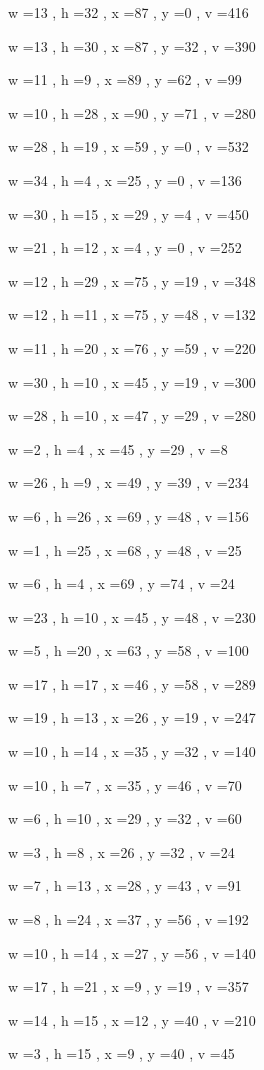 \documentclass[11pt]{article}
\begin{document}
w =13 , h =32 , x =87 , y =0 , v =416
\par
w =13 , h =30 , x =87 , y =32 , v =390
\par
w =11 , h =9 , x =89 , y =62 , v =99
\par
w =10 , h =28 , x =90 , y =71 , v =280
\par
w =28 , h =19 , x =59 , y =0 , v =532
\par
w =34 , h =4 , x =25 , y =0 , v =136
\par
w =30 , h =15 , x =29 , y =4 , v =450
\par
w =21 , h =12 , x =4 , y =0 , v =252
\par
w =12 , h =29 , x =75 , y =19 , v =348
\par
w =12 , h =11 , x =75 , y =48 , v =132
\par
w =11 , h =20 , x =76 , y =59 , v =220
\par
w =30 , h =10 , x =45 , y =19 , v =300
\par
w =28 , h =10 , x =47 , y =29 , v =280
\par
w =2 , h =4 , x =45 , y =29 , v =8
\par
w =26 , h =9 , x =49 , y =39 , v =234
\par
w =6 , h =26 , x =69 , y =48 , v =156
\par
w =1 , h =25 , x =68 , y =48 , v =25
\par
w =6 , h =4 , x =69 , y =74 , v =24
\par
w =23 , h =10 , x =45 , y =48 , v =230
\par
w =5 , h =20 , x =63 , y =58 , v =100
\par
w =17 , h =17 , x =46 , y =58 , v =289
\par
w =19 , h =13 , x =26 , y =19 , v =247
\par
w =10 , h =14 , x =35 , y =32 , v =140
\par
w =10 , h =7 , x =35 , y =46 , v =70
\par
w =6 , h =10 , x =29 , y =32 , v =60
\par
w =3 , h =8 , x =26 , y =32 , v =24
\par
w =7 , h =13 , x =28 , y =43 , v =91
\par
w =8 , h =24 , x =37 , y =56 , v =192
\par
w =10 , h =14 , x =27 , y =56 , v =140
\par
w =17 , h =21 , x =9 , y =19 , v =357
\par
w =14 , h =15 , x =12 , y =40 , v =210
\par
w =3 , h =15 , x =9 , y =40 , v =45
\end{document}
